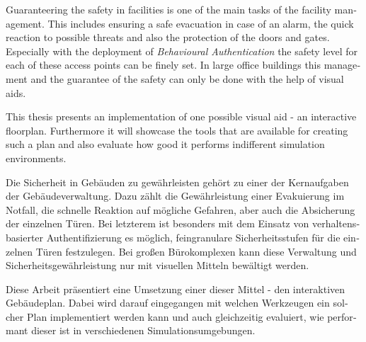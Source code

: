 
\null\vfil
\begin{otherlanguage}{english}
\begin{center}\textsf{\textbf{\abstractname}}\end{center}

\noindent Guaranteering the safety in facilities is one of the main tasks of the facility management. This includes ensuring a safe evacuation in case of an alarm, the quick reaction to possible threats and also the protection of the doors and gates. Especially with the deployment of \emph{Behavioural Authentication} the safety level for each of these access points can be finely set. In large office buildings this management and the guarantee of the safety can only be done with the help of visual aids.

This thesis presents an implementation of one possible visual aid - an interactive floorplan. Furthermore it will showcase the tools that are available for creating such a plan and also evaluate how good it performs indifferent simulation environments.

\end{otherlanguage}
\vfil\null



\null\vfil
\begin{otherlanguage}{ngerman}
\begin{center}\textsf{\textbf{\abstractname}}\end{center}

\noindent Die Sicherheit in Gebäuden zu gewährleisten gehört zu einer der Kernaufgaben der Gebäudeverwaltung. Dazu zählt die Gewährleistung einer Evakuierung im Notfall, die schnelle Reaktion auf mögliche Gefahren, aber auch die Absicherung der einzelnen Türen. Bei letzterem ist besonders mit dem Einsatz von verhaltensbasierter Authentifizierung es möglich, feingranulare Sicherheitsstufen für die einzelnen Türen festzulegen. Bei großen Bürokomplexen kann diese Verwaltung und Sicherheitsgewährleistung nur mit visuellen Mitteln bewältigt werden. 

Diese Arbeit präsentiert eine Umsetzung einer dieser Mittel - den interaktiven Gebäudeplan. Dabei wird darauf eingegangen mit welchen Werkzeugen ein solcher Plan implementiert werden kann und auch gleichzeitig evaluiert, wie performant dieser ist in  verschiedenen Simulationsumgebungen.

\end{otherlanguage}
\vfil\null



